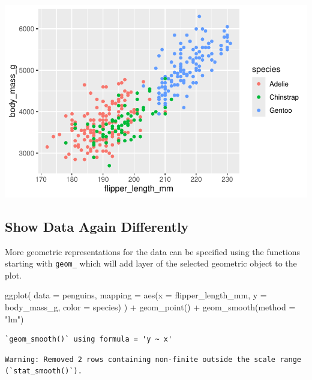 \documentclass[
  letterpaper,
  DIV=11,
  numbers=noendperiod]{scrreprt}
\newenvironment{Shaded}{\begin{snugshade}}{\end{snugshade}}
\newcommand{\AttributeTok}[1]{\textcolor[rgb]{0.40,0.45,0.13}{#1}}
\newcommand{\FunctionTok}[1]{\textcolor[rgb]{0.28,0.35,0.67}{#1}}
\newcommand{\NormalTok}[1]{\textcolor[rgb]{0.00,0.23,0.31}{#1}}
\newcommand{\SpecialCharTok}[1]{\textcolor[rgb]{0.37,0.37,0.37}{#1}}
\newcommand{\StringTok}[1]{\textcolor[rgb]{0.13,0.47,0.30}{#1}}
\begin{document}
\includegraphics{src/r-for-data-science/01-data-viz_files/figure-pdf/unnamed-chunk-8-1.pdf}

\subsection{Show Data Again
Differently}\label{show-data-again-differently}

More geometric representations for the data can be specified using the
functions starting with \texttt{geom\_} which will add layer of the
selected geometric object to the plot.

\begin{Shaded}
\begin{Highlighting}[]
\FunctionTok{ggplot}\NormalTok{(}
  \AttributeTok{data =}\NormalTok{ penguins,}
  \AttributeTok{mapping =} \FunctionTok{aes}\NormalTok{(}\AttributeTok{x =}\NormalTok{ flipper\_length\_mm, }\AttributeTok{y =}\NormalTok{ body\_mass\_g, }\AttributeTok{color =}\NormalTok{ species)}
\NormalTok{) }\SpecialCharTok{+}
  \FunctionTok{geom\_point}\NormalTok{() }\SpecialCharTok{+}
  \FunctionTok{geom\_smooth}\NormalTok{(}\AttributeTok{method =} \StringTok{"lm"}\NormalTok{)}
\end{Highlighting}
\end{Shaded}

\begin{verbatim}
`geom_smooth()` using formula = 'y ~ x'
\end{verbatim}

\begin{verbatim}
Warning: Removed 2 rows containing non-finite outside the scale range
(`stat_smooth()`).
\end{verbatim}
\end{document}
